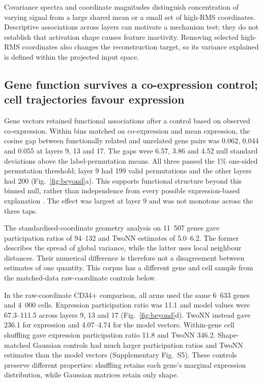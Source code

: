\documentclass[review,authoryear,12pt]{elsarticle}
\begin{document}
Covariance spectra and coordinate magnitudes distinguish concentration of varying signal from
a large shared mean or a small set of high-RMS coordinates. Descriptive associations across layers
can motivate a mechanism test; they do not establish that activation shape causes feature inactivity.
Removing selected high-RMS coordinates also changes the reconstruction target, so its variance
explained is defined within the projected input space.

\subsection{Gene function survives a co-expression control; cell trajectories favour expression}
\label{sec:geometry}
Gene vectors retained functional associations after a control based on observed co-expression.
Within bins matched on co-expression and mean expression, the cosine gap between functionally
related and unrelated gene pairs was 0.062, 0.044 and 0.055 at layers 9, 13 and 17.
The gaps were 6.57, 3.86 and 4.52 null standard deviations above the label-permutation means.
All three passed the 1\% one-sided permutation threshold; layer 9 had 199 valid permutations and
the other layers had 200 (Fig.~\ref{fig:beyond}a). This supports functional structure beyond this
binned null, rather than independence from every possible expression-based explanation
\citep{ref13,ref37}. The effect was largest at layer 9 and was not monotone across the three taps.

The standardised-coordinate geometry analysis on 11~507 genes gave participation ratios of 94--132
and TwoNN estimates of 5.0--6.2. The former describes the spread of global variance, while the latter uses local neighbour
distances. Their numerical difference is therefore not a disagreement between estimates of one
quantity. This corpus has a different gene and cell sample from the matched-data raw-coordinate
controls below.

In the raw-coordinate CD34+ comparison, all arms used the same 6~633 genes and 4~000 cells.
Expression participation ratio was 11.1 and model values were 67.3--111.5 across layers 9, 13
and 17 (Fig.~\ref{fig:beyond}d). TwoNN instead gave 236.1 for expression and 4.07--4.74 for the
model vectors. Within-gene cell shuffling gave expression participation ratio 11.8 and
TwoNN 346.2. Shape-matched Gaussian controls had much larger participation ratios and TwoNN
estimates than the model vectors (Supplementary Fig.~S5). These controls preserve different
properties: shuffling retains each gene's marginal expression distribution, while Gaussian
matrices retain only shape.
\end{document}
